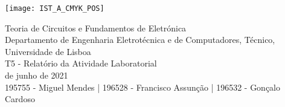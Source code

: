 
\thispagestyle {empty}

\texttt{[image: IST\_A\_CMYK\_POS]}

\begin{center}
%
\vspace{1.0cm}

\vspace{1cm}
{\FontLb Teoria de Circuitos e Fundamentos de Eletrónica} \\ %
\vspace{1cm}
{\FontSn Departamento de Engenharia Eletrotécnica e de Computadores, Técnico, Universidade de Lisboa} \\ %
\vspace{1cm}
{\FontSn T5 - Relatório da Atividade Laboratorial} \\
\vspace{1cm}
{ de junho de 2021} \\ %
\vspace{1cm}
{195755 - Miguel Mendes |}
{196528 - Francisco Assunção |}
{196532 - Gonçalo Cardoso}

\end{center}